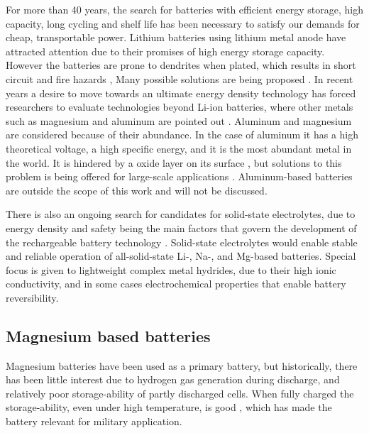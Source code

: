 For more than 40 years, the search for batteries with efficient energy storage, high capacity, long cycling and shelf life has been necessary to satisfy our demands for cheap, transportable power. Lithium batteries using lithium metal anode have attracted attention due to their promises of high energy storage capacity. However the batteries are prone to dendrites when plated, which results in short circuit and fire hazards \cite{xu2004nonaqueous}\cite{kim2013metallic}, Many possible solutions are being proposed \cite{liu2016lithium} \cite{zhang2015ex} \cite{li2018self} \cite{lee2017suppressing}. In recent years a desire to move towards an ultimate energy density technology has forced researchers to evaluate technologies beyond Li-ion batteries, where other metals such as magnesium and aluminum are pointed out \cite{reddy2011linden} \cite{yoo2013mg}. Aluminum and magnesium are considered because of their abundance. In the case of aluminum it has a high theoretical voltage, a high specific energy, and it is the most abundant metal in the world. It is hindered by a oxide layer on its surface \cite{li2002aluminum}, but solutions to this problem is being offered for large-scale applications \cite{van2014rechargeable}. Aluminum-based batteries are outside the scope of this work and will not be discussed.


There is also an ongoing search for candidates for solid-state electrolytes, due to energy density and safety being the main factors that govern the development of the rechargeable battery technology \cite{guzik2019lightweight}. Solid-state electrolytes would enable stable and reliable operation of all-solid-state Li-, Na-, and Mg-based batteries. Special focus is given to lightweight complex metal hydrides, due to their high ionic conductivity, and in some cases electrochemical properties that enable battery reversibility.


\subsection{Magnesium based batteries}
	
	Magnesium batteries have been used as a primary battery, but historically, there has been little interest due to hydrogen gas generation during discharge, and relatively poor storage-ability of partly discharged cells. When fully charged the storage-ability, even under high temperature, is good \cite{reddy2011linden}, which has made the battery relevant for military application.

